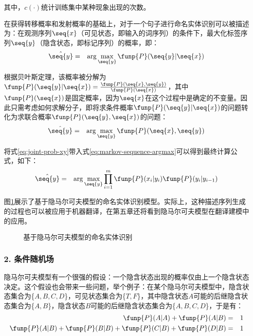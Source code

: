 \noindent 其中，${c}(\cdot)$统计训练集中某种现象出现的次数。

\parinterval 在获得转移概率和发射概率的基础上，对于一个句子进行命名实体识别可以被描述为：在观测序列$\seq{x}$（可见状态，即输入的词序列）的条件下，最大化标签序列$\seq{y}$（隐含状态，即标记序列）的概率，即：
\begin{eqnarray}
\hat{\seq{y}} &=& \arg\max_{\seq{y}}\funp{P}(\seq{y}|\seq{x})
\label{eq:3.3-3}
\end{eqnarray}

\parinterval 根据贝叶斯定理，该概率被分解为$\funp{P}(\seq{y}|\seq{x})=\frac{\funp{P}(\seq{x},\seq{y})}{\funp{P}(\seq{x})}$，其中$\funp{P}(\seq{x})$是固定概率，因为$\seq{x}$在这个过程中是确定的不变量。因此只需考虑如何求解分子，即将求条件概率$\funp{P}(\seq{y}|\seq{x})$的问题转化为求联合概率$\funp{P}(\seq{y},\seq{x})$的问题：
\begin{eqnarray}
\hat{\seq{y}} &=& \arg\max_{\seq{y}}\funp{P}(\seq{x},\seq{y}) \label{eq:markov-sequence-argmax}
\label{eq:3.3-4}
\end{eqnarray}

\parinterval 将式\eqref{eq:joint-prob-xy}带入式\eqref{eq:markov-sequence-argmax}可以得到最终计算公式，如下：
\begin{eqnarray}
\hat{\seq{y}} &=& \arg\max_{\seq{y}}\prod_{i=1}^{m}\funp{P}(x_i|y_i)\funp{P}(y_i|y_{i-1})
\label{eq:3.3-5}
\end{eqnarray}

\parinterval 图\ref{fig:3.3-4}展示了基于隐马尔可夫模型的命名实体识别模型。实际上，这种描述序列生成的过程也可以被应用于机器翻译，在第五章还将看到隐马尔可夫模型在翻译建模中的应用。

\begin{figure}[htp]
\centering

\caption{基于隐马尔可夫模型的命名实体识别}
\label{fig:3.3-4}
\end{figure}


\subsubsection{2. 条件随机场}

\parinterval 隐马尔可夫模型有一个很强的假设：一个隐含状态出现的概率仅由上一个隐含状态决定。这个假设也会带来一些问题，举个例子：在某个隐马尔可夫模型中，隐含状态集合为\{$A, B, C, D$\}，可见状态集合为\{$T, F$\}，其中隐含状态$A$可能的后继隐含状态集合为\{$A, B$\}，隐含状态$B$可能的后继隐含状态集合为\{$A, B, C, D$\}，于是有：
\begin{eqnarray}
\funp{P}(A|A)+\funp{P}(A|B) & = & 1 \label{eq:3.3-6} \\
\funp{P}(A|B)+\funp{P}(B|B)+\funp{P}(C|B)+\funp{P}(D|B) & = & 1 \label{eq:3.3-7}
\end{eqnarray}

